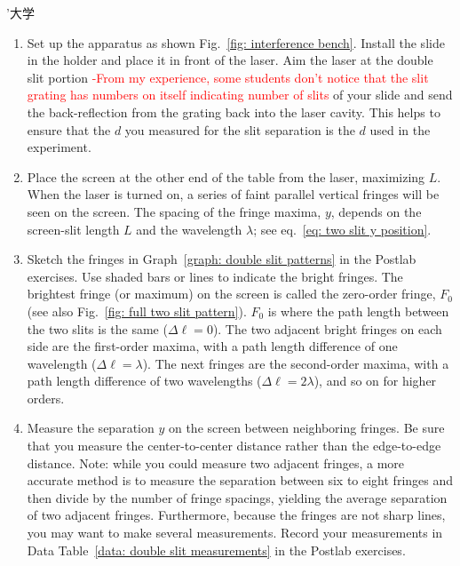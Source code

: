 ’大学\documentclass[addpoints]{physlabs}
\begin{document}
\begin{labsection}
\begin{experiment}
\begin{enumerate}
        Turn the screw in only one direction to avoid mechanical ``backlash'' errors. Your lab assistant will help you. (This measurement does not need to be made first. Since there is only one microscope, you may want to wait a while to avoid the queue.)

        \item Set up the apparatus as shown Fig.~\ref{fig: interference bench}. Install the slide in the holder and place it in front of the laser. Aim the laser at the double slit portion \textcolor{red}{-From my experience, some students don't notice that the slit grating has numbers on itself indicating number of slits}
        of your slide and send the back-reflection from the grating back into the laser cavity. This helps to ensure that the $d$ you measured for the slit separation is the $d$ used in the experiment.

        \item Place the screen at the other end of the table from the laser, maximizing $L$. When the laser is turned on, a series of faint parallel vertical fringes will be seen on the screen. The spacing of the fringe maxima, $y$, depends on the screen-slit length $L$ and the wavelength $\lambda$; see eq.~\ref{eq: two slit y position}.

        \item Sketch the fringes in Graph~\ref{graph: double slit patterns} in the Postlab exercises. Use shaded bars or lines to indicate the bright fringes. The brightest fringe (or maximum) on the screen is called the zero-order fringe, $F_0$ (see also Fig.~\ref{fig: full two slit pattern}). $F_0$ is where the path length between the two slits is the same ($\Delta\ell=0$). The two adjacent bright fringes on each side are the first-order maxima, with a path length difference of one wavelength ($\Delta\ell=\lambda$). The next fringes are the second-order maxima, with a path length difference of two wavelengths ($\Delta\ell=2\lambda$), and so on for higher orders.

        \item Measure the separation $y$ on the screen between neighboring fringes. Be sure that you measure the center-to-center distance rather than the edge-to-edge distance. Note: while you could measure two adjacent fringes, a more accurate method is to measure the separation between six to eight fringes and then divide by the number of fringe spacings, yielding the average separation of two adjacent fringes. Furthermore, because the fringes are not sharp lines, you may want to make several measurements. Record your measurements in Data Table~\ref{data: double slit measurements} in the Postlab exercises.


\end{enumerate}
\end{experiment}
\end{labsection}
\end{document}
